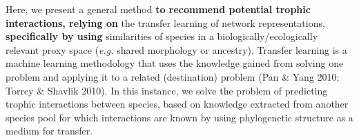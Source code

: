 \documentclass[11pt]{article}
\makeatletter
\def\maxwidth{\ifdim\Gin@nat@width>\linewidth\linewidth
\else\Gin@nat@width\fi}
\let\Oldincludegraphics\includegraphics
\renewcommand{\includegraphics}[1]{\Oldincludegraphics[width=\maxwidth]{#1}}
\providecommand{\DIFaddtex}[1]{{\bf #1}} %
\providecommand{\DIFdeltex}[1]{} %
\providecommand{\DIFaddbegin}{\protect\color{blue}} %
\providecommand{\DIFaddend}{\protect\color{black}} %
\providecommand{\DIFdelbegin}{\protect\color{red}} %
\providecommand{\DIFdelend}{\protect\color{black}} %
\providecommand{\DIFadd}[1]{\texorpdfstring{\DIFaddtex{#1}}{#1}} %
\providecommand{\DIFdel}[1]{\texorpdfstring{\DIFdeltex{#1}}{}} %
\newcommand{\DIFscaledelfig}{0.5}
\newlength{\DIFdelgraphicswidth} %
\newlength{\DIFdelgraphicsheight} %
\newcommand{\DIFaddincludegraphics}[2][]{{\color{blue}\fbox{\DIFOincludegraphics[#1]{#2}}}} %
\newcommand{\DIFdelincludegraphics}[2][]{%
\sbox{\DIFdelgraphicsbox}{\DIFOincludegraphics[#1]{#2}}%
\settoboxwidth{\DIFdelgraphicswidth}{\DIFdelgraphicsbox} %
\settoboxtotalheight{\DIFdelgraphicsheight}{\DIFdelgraphicsbox} %
\scalebox{\DIFscaledelfig}{%
\parbox[b]{\DIFdelgraphicswidth}{\usebox{\DIFdelgraphicsbox}\\[-\baselineskip] \rule{\DIFdelgraphicswidth}{0em}}\llap{\resizebox{\DIFdelgraphicswidth}{\DIFdelgraphicsheight}{%
\setlength{\unitlength}{\DIFdelgraphicswidth}%
\begin{picture}(1,1)%
\thicklines\linethickness{2pt} %
{\color[rgb]{1,0,0}\put(0,0){\framebox(1,1){}}}%
{\color[rgb]{1,0,0}\put(0,0){\line( 1,1){1}}}%
{\color[rgb]{1,0,0}\put(0,1){\line(1,-1){1}}}%
\end{picture}%
}\hspace*{3pt}}} %
} %
\DeclareRobustCommand{\DIFaddbegin}{\DIFOaddbegin \let\includegraphics\DIFaddincludegraphics} %
\DeclareRobustCommand{\DIFaddend}{\DIFOaddend \let\includegraphics\DIFOincludegraphics} %
\DeclareRobustCommand{\DIFdelbegin}{\DIFOdelbegin \let\includegraphics\DIFdelincludegraphics} %
\DeclareRobustCommand{\DIFdelend}{\DIFOaddend \let\includegraphics\DIFOincludegraphics} %
\makeatother
\begin{document}
Here, we present a general method \DIFdelbegin \DIFdel{for }\DIFdelend \DIFaddbegin \DIFadd{to recommend potential trophic
interactions, relying on }\DIFaddend the transfer learning of network
representations, \DIFdelbegin \DIFdel{relying on the }\DIFdelend \DIFaddbegin \DIFadd{specifically by using }\DIFaddend similarities of species in a
biologically/ecologically relevant proxy space (\emph{e.g.} shared
morphology or ancestry). Transfer learning is a machine learning
methodology that uses the knowledge gained from solving one problem and
applying it to a related (destination) problem (Pan \& Yang 2010; Torrey
\& Shavlik 2010). In this instance, we solve the problem of predicting
trophic interactions between species, based on knowledge extracted from
another species pool for which interactions are known by using
phylogenetic structure as a medium for transfer. \DIFdelbegin \DIFdel{This allows us to
construct a \emph{probabilistic} metaweb for a community for which we
have \emph{no} prior trophic interaction data for the desired species
pool. Our methodology is outlined in fig.~\ref{fig:concept}, where we
provide an illustration based on learning the embedding of a metaweb of
trophic interactions for European mammals (known interactions; Maiorano
\emph{et al.} 2020b, a) and, based on phylogenetic relationships between
mammals globally (\emph{i.e.}, phylogenetic tree Upham \emph{et al.}
2019), infer a metaweb for the Canadian mammalian species pool
(interactions are treated as unknown in this instance).
}%

\end{document}
